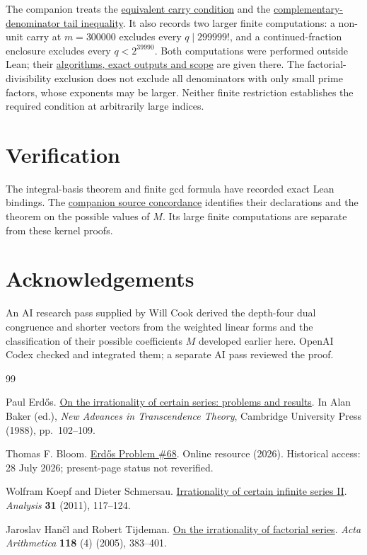 \documentclass[11pt]{article}
\begin{document}
The companion treats the
\href{erdos68-factorial-reasoning-surface.pdf\#r5-carry}{equivalent carry condition}
and the
\href{erdos68-factorial-reasoning-surface.pdf\#r5-complement}{complementary-denominator tail inequality}.
It also records two larger finite computations: a non-unit carry at
$m=300000$ excludes every $q\mid299999!$, and a continued-fraction
enclosure excludes every $q<2^{39990}$. Both computations were performed
outside Lean; their
\href{erdos68-factorial-reasoning-surface.pdf\#r12-finite}{algorithms, exact outputs and scope}
are given there. The factorial-divisibility exclusion does not exclude
all denominators with only small prime factors, whose exponents may be
larger. Neither finite restriction establishes the required condition
at arbitrarily large indices.

\section{Verification}\label{app:sources}

\evidenceparagraph{\evidencerecordurl}

The integral-basis theorem and finite gcd formula have
recorded exact Lean bindings. The
\href{erdos68-factorial-reasoning-surface.pdf\#r12-short-sources}{companion source concordance}
identifies their declarations and the theorem on the possible values of $M$. Its
large finite computations are separate from these kernel proofs.

\section*{Acknowledgements}

An AI research pass supplied by Will Cook derived the depth-four dual
congruence and shorter vectors from the weighted linear forms and the
classification of their possible coefficients $M$ developed earlier here. OpenAI Codex
checked and integrated them; a separate AI pass reviewed the proof.

\begin{thebibliography}{99}

Paul Erd{\H o}s. \href{https://doi.org/10.1017/CBO9780511897184.009}{On the irrationality of certain series: problems and results}.
In Alan Baker (ed.), \emph{New Advances in Transcendence Theory}, Cambridge University Press (1988), pp.~102--109.

Thomas F. Bloom. \href{https://www.erdosproblems.com/68}{Erd{\H o}s Problem {\#68}}.
Online resource (2026). Historical access: 28 July 2026; present-page status not reverified.

Wolfram Koepf and Dieter Schmersau. \href{https://doi.org/10.1524/anly.2011.1094}{Irrationality of certain infinite series {II}}.
\emph{Analysis} \textbf{31} (2011), 117--124.

Jaroslav Han{\v c}l and Robert Tijdeman. \href{https://doi.org/10.4064/aa118-4-5}{On the irrationality of factorial series}.
\emph{Acta Arithmetica} \textbf{118} (4) (2005), 383--401.

\end{thebibliography}
\end{document}
